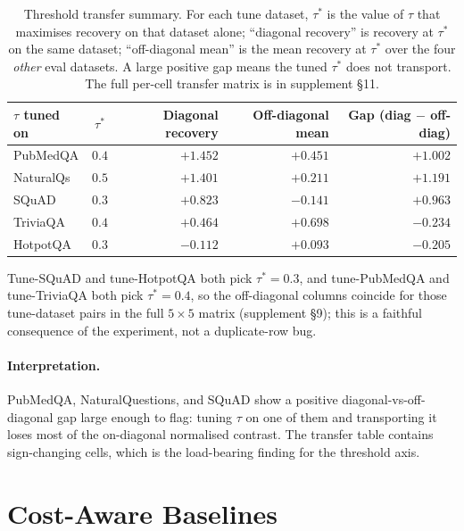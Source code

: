 \begin{table}[!htb]
\centering
\caption{Threshold transfer summary. For each tune dataset, $\tau^\ast$
is the value of $\tau$ that maximises recovery on that dataset alone;
``diagonal recovery'' is recovery at $\tau^\ast$ on the same dataset;
``off-diagonal mean'' is the mean recovery at $\tau^\ast$ over the four
\emph{other} eval datasets. A large positive gap means the tuned
$\tau^\ast$ does not transport. The full per-cell transfer matrix is
in supplement \S 11.}
\label{tab:threshold_transfer_main}
\footnotesize
\begin{tabular}{lcrrr}
\toprule
$\tau$ tuned on & $\tau^\ast$ & Diagonal recovery & Off-diagonal mean & Gap (diag $-$ off-diag) \\
\midrule
PubMedQA  & $0.4$ & $+1.452$ & $+0.451$ & $+1.002$ \\
NaturalQs & $0.5$ & $+1.401$ & $+0.211$ & $+1.191$ \\
SQuAD     & $0.3$ & $+0.823$ & $-0.141$ & $+0.963$ \\
TriviaQA  & $0.4$ & $+0.464$ & $+0.698$ & $-0.234$ \\
HotpotQA  & $0.3$ & $-0.112$ & $+0.093$ & $-0.205$ \\
\bottomrule
\end{tabular}
\end{table}

Tune-SQuAD and tune-HotpotQA both pick $\tau^\ast = 0.3$, and
tune-PubMedQA and tune-TriviaQA both pick $\tau^\ast = 0.4$, so the
off-diagonal columns coincide for those tune-dataset pairs in the
full $5{\times}5$ matrix (supplement \S 9); this is a faithful
consequence of the experiment, not a duplicate-row bug.

\paragraph{Interpretation.} PubMedQA, NaturalQuestions, and SQuAD
show a positive diagonal-vs-off-diagonal gap large enough to flag:
tuning $\tau$ on one of them and transporting it loses most of the
on-diagonal normalised contrast. The transfer table contains
sign-changing cells, which is the load-bearing finding for the
threshold axis.


\section{Cost-Aware Baselines}
\label{sec:cost}

